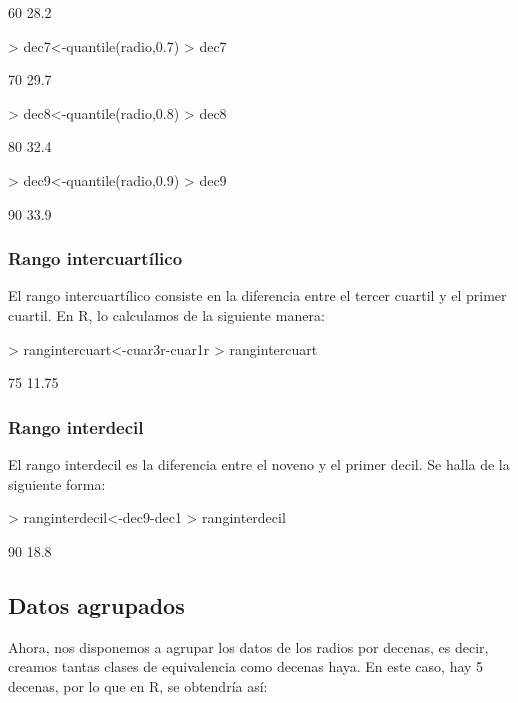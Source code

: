 \documentclass [a4paper] {article}
\begin{document}
\begin{Schunk}
\begin{Soutput}
 60%
28.2 
\end{Soutput}
\begin{Sinput}
> dec7<-quantile(radio,0.7)
> dec7
\end{Sinput}
\begin{Soutput}
 70%
29.7 
\end{Soutput}
\begin{Sinput}
> dec8<-quantile(radio,0.8)
> dec8
\end{Sinput}
\begin{Soutput}
 80%
32.4 
\end{Soutput}
\begin{Sinput}
> dec9<-quantile(radio,0.9)
> dec9
\end{Sinput}
\begin{Soutput}
 90%
33.9 
\end{Soutput}
\end{Schunk}

\subsubsection{Rango intercuartílico}
El rango intercuartílico consiste en la diferencia entre el tercer cuartil y el primer cuartil. En R, lo calculamos
de la siguiente manera:

\begin{Schunk}
\begin{Sinput}
> rangintercuart<-cuar3r-cuar1r
> rangintercuart
\end{Sinput}
\begin{Soutput}
  75%
11.75 
\end{Soutput}
\end{Schunk}


\subsubsection{Rango interdecil}
El rango interdecil es la diferencia entre el noveno y el primer decil. Se halla de la siguiente forma:

\begin{Schunk}
\begin{Sinput}
> ranginterdecil<-dec9-dec1
> ranginterdecil
\end{Sinput}
\begin{Soutput}
 90%
18.8 
\end{Soutput}
\end{Schunk}


\subsection{Datos agrupados}
Ahora, nos disponemos a agrupar los datos de los radios por decenas, es decir, creamos tantas clases de equivalencia
como decenas haya. En este caso, hay 5 decenas, por lo que en R, se obtendría así:
\end{document}
